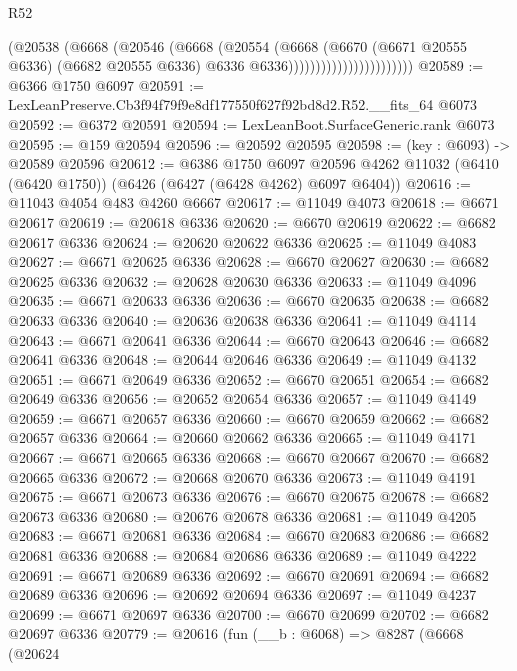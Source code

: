 \begin{lexlean}{R52}
\begin{coremodule}
                                    (@20538
                                      (@6668
                                        (@20546
                                          (@6668
                                            (@20554
                                              (@6668
                                                (@6670
                                                  (@6671 @20555 @6336)
                                                  (@6682 @20555 @6336)
                                                  @6336
                                                  @6336)))))))))))))))))))))))
@20589 := @6366 @1750 @6097
@20591 := LexLeanPreserve.Cb3f94f79f9e8df177550f627f92bd8d2.R52.__fits_64 @6073
@20592 := @6372 @20591
@20594 := LexLeanBoot.SurfaceGeneric.rank @6073
@20595 := @159 @20594
@20596 := @20592 @20595
@20598 := (key : @6093) -> @20589 @20596
@20612 := @6386
    @1750
    @6097
    @20596
    @4262
    @11032
    (@6410 (@6420 @1750))
    (@6426 (@6427 (@6428 @4262) @6097 @6404))
@20616 := @11043 @4054 @483 @4260 @6667
@20617 := @11049 @4073
@20618 := @6671 @20617
@20619 := @20618 @6336
@20620 := @6670 @20619
@20622 := @6682 @20617 @6336
@20624 := @20620 @20622 @6336
@20625 := @11049 @4083
@20627 := @6671 @20625 @6336
@20628 := @6670 @20627
@20630 := @6682 @20625 @6336
@20632 := @20628 @20630 @6336
@20633 := @11049 @4096
@20635 := @6671 @20633 @6336
@20636 := @6670 @20635
@20638 := @6682 @20633 @6336
@20640 := @20636 @20638 @6336
@20641 := @11049 @4114
@20643 := @6671 @20641 @6336
@20644 := @6670 @20643
@20646 := @6682 @20641 @6336
@20648 := @20644 @20646 @6336
@20649 := @11049 @4132
@20651 := @6671 @20649 @6336
@20652 := @6670 @20651
@20654 := @6682 @20649 @6336
@20656 := @20652 @20654 @6336
@20657 := @11049 @4149
@20659 := @6671 @20657 @6336
@20660 := @6670 @20659
@20662 := @6682 @20657 @6336
@20664 := @20660 @20662 @6336
@20665 := @11049 @4171
@20667 := @6671 @20665 @6336
@20668 := @6670 @20667
@20670 := @6682 @20665 @6336
@20672 := @20668 @20670 @6336
@20673 := @11049 @4191
@20675 := @6671 @20673 @6336
@20676 := @6670 @20675
@20678 := @6682 @20673 @6336
@20680 := @20676 @20678 @6336
@20681 := @11049 @4205
@20683 := @6671 @20681 @6336
@20684 := @6670 @20683
@20686 := @6682 @20681 @6336
@20688 := @20684 @20686 @6336
@20689 := @11049 @4222
@20691 := @6671 @20689 @6336
@20692 := @6670 @20691
@20694 := @6682 @20689 @6336
@20696 := @20692 @20694 @6336
@20697 := @11049 @4237
@20699 := @6671 @20697 @6336
@20700 := @6670 @20699
@20702 := @6682 @20697 @6336
@20779 := @20616
    (fun (__b : @6068) =>
    @8287
      (@6668
        (@20624

\end{coremodule}
\end{lexlean}
